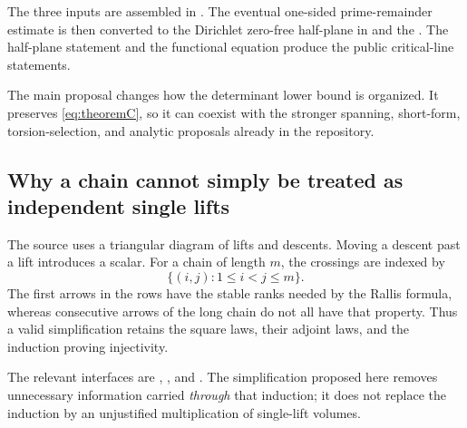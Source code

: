 The three inputs are assembled in
.
The eventual one-sided prime-remainder estimate is then converted to the
Dirichlet zero-free half-plane in
 and the
.
The half-plane statement and the functional equation produce the
public critical-line statements.

The main proposal changes how the determinant lower bound is organized.
It preserves \eqref{eq:theoremC}, so it can coexist with the stronger
spanning, short-form, torsion-selection, and analytic proposals already
in the repository.

\subsection{Why a chain cannot simply be treated as independent single lifts}

The source uses a triangular diagram of lifts and descents. Moving a descent
past a lift introduces a scalar. For a chain of length \(m\), the crossings are
indexed by
\[
 \{(i,j):1\le i<j\le m\}.
\]
The first arrows in the rows have the stable ranks needed by the Rallis
formula, whereas consecutive arrows of the long chain do not all have that
property. Thus a valid simplification retains the square laws, their adjoint
laws, and the induction proving injectivity.

The relevant interfaces are
,
, and
.
The simplification proposed here removes unnecessary information carried
\emph{through} that induction; it does not replace the induction by an
unjustified multiplication of single-lift volumes.
